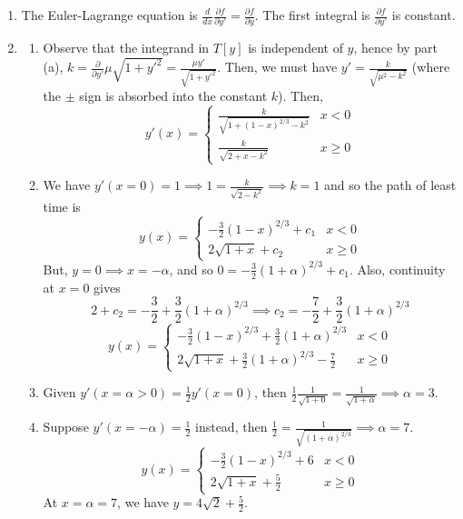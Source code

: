 \documentclass[a4paper]{article}
\begin{document}
\begin{ans}\leavevmode
\begin{enumerate}[label=(\alph*)]
\item The Euler-Lagrange equation is $\frac{d}{dx}\frac{\partial f}{\partial y'}=\frac{\partial f}{\partial y}$. The first integral is $\frac{\partial f}{\partial y'}$ is constant.
\item
\begin{enumerate}[label=(\roman*)]
\item Observe that the integrand in $T[y]$ is independent of $y$, hence by part (a), $k=\frac{\partial}{\partial y'}\mu\sqrt{1+y'^2}=\frac{\mu y'}{\sqrt{1+y'^2}}$. Then, we must have $y'=\frac{k}{\sqrt{\mu^2-k^2}}$ (where the $\pm$ sign is absorbed into the constant $k$). Then,
$$y'(x)=
\left\{
        \begin{array}{ll}
      \frac{k}{\sqrt{1+(1-x)^{2/3}-k^2}} & x<0 \\
      \frac{k}{\sqrt{2+x-k^2}} & x\geq0 
        \end{array}
    \right.$$
\item We have $y'(x=0)=1\implies 1=\frac{k}{\sqrt{2-k^2}}\implies k=1$ and so the path of least time is
$$y(x)=
\left\{
        \begin{array}{ll}
      -\frac{3}{2}(1-x)^{2/3}+c_1 & x<0 \\
      2\sqrt{1+x}+c_2 & x\geq0 
        \end{array}
    \right.$$
But, $y=0\implies x=-\alpha$, and so $0=-\frac{3}{2}(1+\alpha)^{2/3}+c_1$. Also, continuity at $x=0$ gives
$$2+c_2=-\frac{3}{2}+\frac{3}{2}(1+\alpha)^{2/3}\implies c_2=-\frac{7}{2}+\frac{3}{2}(1+\alpha)^{2/3}$$
$$y(x)=
\left\{
        \begin{array}{ll}
      -\frac{3}{2}(1-x)^{2/3}+\frac{3}{2}(1+\alpha)^{2/3} & x<0 \\
      2\sqrt{1+x}+\frac{3}{2}(1+\alpha)^{2/3}-\frac{7}{2} & x\geq0 
        \end{array}
    \right.$$
\item Given $y'(x=\alpha>0)=\frac{1}{2}y'(x=0)$, then $\frac{1}{2}\frac{1}{\sqrt{1+0}}=\frac{1}{\sqrt{1+\alpha}}\implies\alpha=3$.
\item Suppose $y'(x=-\alpha)=\frac{1}{2}$ instead, then $\frac{1}{2}=\frac{1}{\sqrt{(1+\alpha)^{2/3}}}\implies\alpha=7$.
$$y(x)=
\left\{
        \begin{array}{ll}
      -\frac{3}{2}(1-x)^{2/3}+6 & x<0 \\
      2\sqrt{1+x}+\frac{5}{2} & x\geq0 
        \end{array}
    \right.$$
At $x=\alpha=7$, we have $y=4\sqrt{2}+\frac{5}{2}$.
\end{enumerate}
\end{enumerate}
\end{ans}
\end{document}

